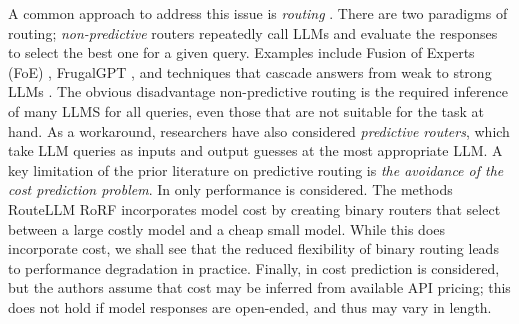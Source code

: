 

A common approach to address this issue %
is \emph{routing} \citep{shnitzer2023large, hu2024routerbench, ong2024routellmlearningroutellms, notdiamond2023rorf,akota2024}. There are two paradigms of routing; \emph{non-predictive} routers repeatedly call LLMs and evaluate the responses to select the best one for a given query. Examples include Fusion of Experts (FoE) \citep{wang2023fusing}, FrugalGPT \citep{chen2024frugalgptTMLR}, and techniques that cascade answers from weak to strong LLMs \citep{yue2024largelanguagemodelcascades}. The obvious disadvantage non-predictive routing is the required inference of many LLMS for all queries, even those that are not suitable for the task at hand. As a workaround, researchers have also considered \emph{predictive routers}, which take LLM queries as inputs and output guesses at the most appropriate LLM.  %
A key limitation of the prior literature on predictive routing is \emph{the avoidance of the cost prediction problem}. In \citet{shnitzer2023large} only performance is considered. The methods RouteLLM %
\citep{ong2024routellmlearningroutellms} RoRF \citep{notdiamond2023rorf} incorporates model cost by creating binary routers that select between a large costly model and a cheap small model. While this does incorporate cost, we shall see that the reduced flexibility of binary routing leads to performance degradation in practice. Finally, in \citet{akota2024} cost prediction is considered, but the authors assume that cost may be inferred from available API pricing; this does not hold if model responses are open-ended, and thus may vary in length. 


